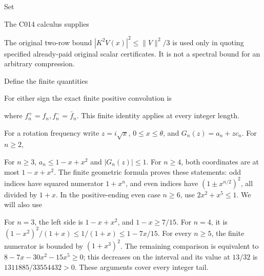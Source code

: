 Set


The C014 calculus supplies


The original two-row bound \(|K^2V(x)|^2\le\|V\|^2/3\) is used
only in quoting specified already-paid original scalar certificates.
It is not a spectral bound for an arbitrary compression.

Define the finite quantities


For either sign the exact finite positive convolution is


where \(f_n^+=f_n,\allowbreak  f_n^-=\bar f_n\). This finite identity applies at every integer length.

For a rotation frequency write \(z=i\sqrt x\), \(0\le x\le\theta\),
and \(G_n(z)=a_n+z c_n\). For \(n\ge2\),


For \(n\ge3\), \(a_n\le1-x+x^2\) and \(|G_n(z)|\le1\).
For \(n\ge4\), both coordinates are at most \(1-x+x^2\).
The finite geometric formula proves these statements: odd indices
have squared numerator \(1+x^n\), and even indices have
\((1\pm x^{n/2})^2\), all divided by \(1+x\). In the positive-ending
even case \(n\ge6\), use \(2x^2+x^5\le1\).
We will also use


For \(n=3\), the left side is \(1-x+x^2\), and \(1-x\ge7/15\).
For \(n=4\), it is \((1-x^2)^2/(1+x)\le1/(1+x)\le1-7x/15\).
For every \(n\ge5\), the finite numerator is bounded by
\((1+x^3)^2\). The remaining comparison is equivalent to
\(8-7x-30x^2-15x^5\ge0\); this decreases on the interval and its
value at \(13/32\) is \(1311885/33554432>0\).
These arguments cover every integer tail.

